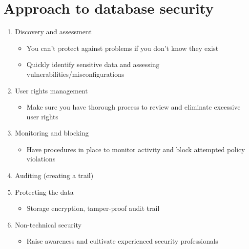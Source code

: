 \documentclass{article}[18pt]
\begin{document}
\section{Approach to database security}
\begin{enumerate}
	\item Discovery and assessment
	\begin{itemize}
		\item You can't protect against problems if you don't know they exist
		\item Quickly identify sensitive data and assessing vulnerabilities/misconfigurations
	\end{itemize}
	\item User rights management
	\begin{itemize}
		\item Make sure you have thorough process to review and eliminate excessive user rights
	\end{itemize}
	\item Monitoring and blocking
	\begin{itemize}
		\item Have procedures in place to monitor activity and block attempted policy violations
	\end{itemize}
	\item Auditing (creating a trail)
	\item Protecting the data
	\begin{itemize}
		\item Storage encryption, tamper-proof audit trail
	\end{itemize}
	\item Non-technical security
	\begin{itemize}
		\item Raise awareness and cultivate experienced security professionals
	\end{itemize}
\end{enumerate}
\end{document}
